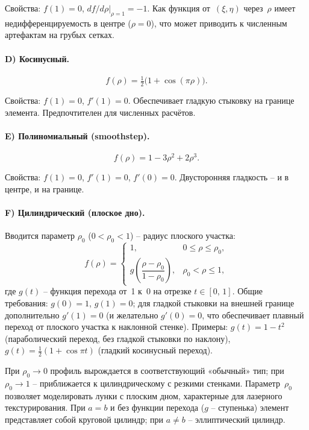 Свойства: $f(1) = 0$, $df/d\rho|_{\rho=1} = -1$. Как функция
от~$(\xi, \eta)$ через~$\rho$ имеет недифференцируемость в центре
($\rho = 0$), что может приводить к численным артефактам на грубых
сетках.

\paragraph{D) Косинусный.}
\begin{equation}
  f(\rho) = \tfrac{1}{2}\bigl(1 + \cos(\pi\rho)\bigr).
  \label{eq:profile_cosine}
\end{equation}

Свойства: $f(1) = 0$, $f'(1) = 0$. Обеспечивает гладкую стыковку
на границе элемента. Предпочтителен для численных расчётов.

\paragraph{E) Полиномиальный (smoothstep).}
\begin{equation}
  f(\rho) = 1 - 3\rho^2 + 2\rho^3.
  \label{eq:profile_smoothstep}
\end{equation}

Свойства: $f(1) = 0$, $f'(1) = 0$, $f'(0) = 0$. Двусторонняя
гладкость -- и в центре, и на границе.

\paragraph{F) Цилиндрический (плоское дно).}
Вводится параметр $\rho_0$ ($0 < \rho_0 < 1$) -- радиус плоского
участка:
\begin{equation}
  f(\rho) =
    \begin{cases}
      1,
        & 0 \leq \rho \leq \rho_0, \\[4pt]
      g\!\left(\dfrac{\rho - \rho_0}{1 - \rho_0}\right),
        & \rho_0 < \rho \leq 1,
    \end{cases}
  \label{eq:profile_plateau}
\end{equation}
где $g(t)$ -- функция перехода от~1 к~0 на отрезке $t \in [0,\,1]$.
Общие требования: $g(0) = 1$, $g(1) = 0$; для гладкой стыковки
на внешней границе дополнительно $g'(1) = 0$ (и желательно
$g'(0) = 0$, что обеспечивает плавный переход от плоского участка
к наклонной стенке).
Примеры: $g(t) = 1 - t^2$ (параболический переход, без гладкой
стыковки по наклону),
$g(t) = \frac{1}{2}(1 + \cos\pi t)$ (гладкий косинусный переход).

При $\rho_0 \to 0$ профиль вырождается в соответствующий «обычный»
тип; при $\rho_0 \to 1$ -- приближается к цилиндрическому с резкими
стенками. Параметр~$\rho_0$ позволяет моделировать лунки с плоским
дном, характерные для лазерного текстурирования. При $a = b$ и без
функции перехода ($g$ -- ступенька) элемент представляет собой
круговой цилиндр; при $a \neq b$ -- эллиптический цилиндр.

